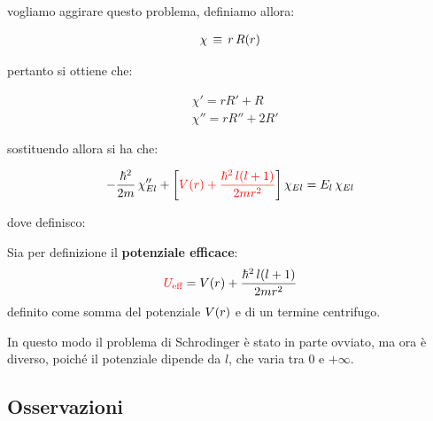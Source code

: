 	vogliamo aggirare questo problema, definiamo allora:
	
\begin{align*}
	\chi \, \equiv \, r \, R\qty(r)
\end{align*}

	pertanto si ottiene che:
	
\begin{align*}
	& \chi' = r R' + R \\
	& \chi'' = rR'' + 2R'
\end{align*}
	
	sostituendo allora si ha che:
	
\begin{nb}
\begin{align*}
	- \frac{\hbar^2}{2m} \, \chi_{El}'' + \qty[ \textcolor{red}{ V\qty(r) +  \frac{\hbar^2 \, l\qty(l +1)}{2mr^2}}   ] \, \chi_{El} = E_{l} \, \chi_{El} 
\end{align*}
\end{nb}

	dove definisco:
	
\begin{mydef}
	Sia per definizione il \textbf{potenziale efficace}:
\begin{align*}
	\textcolor{red}{U_{\text{eff}}} = V\qty(r) + \frac{\hbar^2 \, l\qty(l+1)}{2mr^2}
\end{align*}
	definito come somma del potenziale $V\qty(r)$ e di un termine centrifugo. 
\end{mydef}

	In questo modo il problema di Schrodinger è stato in parte ovviato, ma ora è diverso, poiché il potenziale dipende da $l$, che varia tra $0$ e $+ \infty$.
	
\subsection{Osservazioni}

